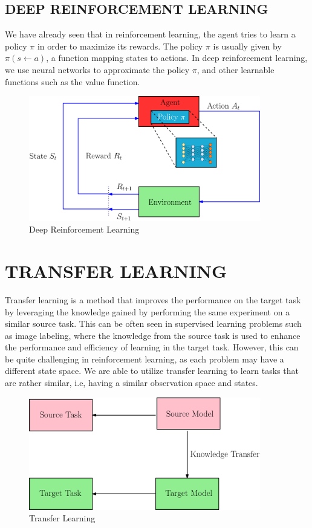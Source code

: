 \subsection{DEEP REINFORCEMENT LEARNING}

We have already seen that in reinforcement learning, the
agent tries to learn a policy $\pi$ in order to maximize its
rewards. The policy $\pi$ is usually given by
$\pi(s\gets a)$, a function mapping states to actions. In
deep reinforcement learning, we use neural networks to
approximate the policy $\pi$, and other learnable functions
such as the value function.

\begin{figure}[H]
    \centering
    \includegraphics[width=0.9\textwidth]{images/drlv3.png}
    \caption{Deep Reinforcement Learning}
    \label{fig:rl}
\end{figure}

\section{TRANSFER LEARNING}

Transfer learning is a method that improves the performance
on the target task by leveraging the knowledge gained by
performing the same experiment on a similar source task. This
can be often seen in supervised learning problems such as
image labeling, where the knowledge from the source task is
used to enhance the performance and efficiency of learning in
the target task. However, this can be quite challenging in
reinforcement learning, as each problem may have a different
state space. We are able to utilize transfer learning to
learn tasks that are rather similar, i.e, having a similar
observation space and states.

\begin{figure}[H]
    \centering
    \includegraphics[width=0.9\textwidth]{images/tlv3.png}
    \caption{Transfer Learning}
    \label{fig:rl}
\end{figure}

